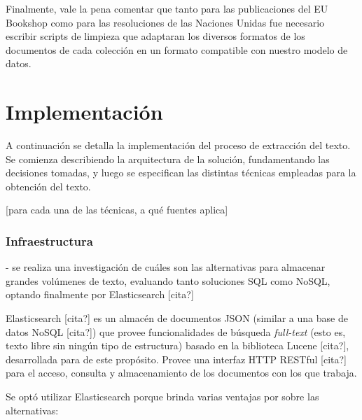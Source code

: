 Finalmente, vale la pena comentar que tanto para las publicaciones del EU Bookshop como para las
resoluciones de las Naciones Unidas fue necesario escribir scripts de limpieza que adaptaran los diversos
formatos de los documentos de cada colección en un formato compatible con nuestro modelo de datos.


\section{Implementación}

A continuación se detalla la implementación del proceso de extracción del texto. Se comienza
describiendo la arquitectura de la solución, fundamentando las decisiones tomadas, y luego se
especifican las distintas técnicas empleadas para la obtención del texto.

[para cada una de las técnicas, a qué fuentes aplica]

\subsubsection{Infraestructura}

- se realiza una investigación de cuáles son las alternativas para almacenar grandes volúmenes de
  texto, evaluando tanto soluciones SQL como NoSQL, optando finalmente por Elasticsearch [cita?]

Elasticsearch [cita?] es un almacén de documentos JSON (similar a una base de datos NoSQL [cita?])
que provee funcionalidades de búsqueda \textit{full-text} (esto es, texto libre sin ningún tipo de
estructura) basado en la biblioteca Lucene [cita?], desarrollada para de este propósito. Provee
una interfaz HTTP RESTful [cita?] para el acceso, consulta y almacenamiento de los documentos con
los que trabaja.

Se optó utilizar Elasticsearch porque brinda varias ventajas por sobre las alternativas:

